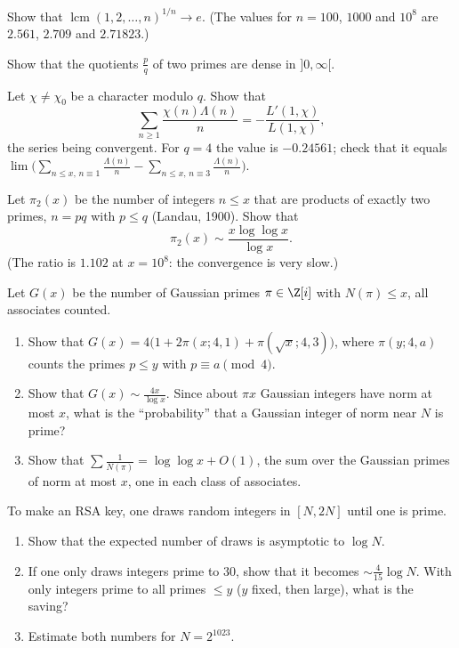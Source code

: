 \begin{exercise}[$\star$]\label{ex:lcm}
Show that $\operatorname{lcm}(1,2,\dots,n)^{1/n}\to e$. (The values for $n=100$, $1000$ and $10^8$ are $2.561$, $2.709$ and $2.71823$.)
\end{exercise}

\begin{exercise}[$\star$]\label{ex:ratios}
Show that the quotients $\frac pq$ of two primes are dense in $]0,\infty[$.
\end{exercise}

\begin{exercise}[$\star\star$]\label{ex:lprimeseries}
Let $\chi\ne\chi_0$ be a character modulo $q$. Show that
\[
\sum_{n\ge1}\frac{\chi(n)\Lambda(n)}n=-\frac{L'(1,\chi)}{L(1,\chi)},
\]
the series being convergent. For $q=4$ the value is $-0.24561$; check that it equals $\lim\bigl(\sum_{n\le x,\,n\equiv1}\frac{\Lambda(n)}n-\sum_{n\le x,\,n\equiv3}\frac{\Lambda(n)}n\bigr)$.
\end{exercise}

\begin{exercise}[$\star\star\star$]\label{ex:semiprimes}
Let $\pi_2(x)$ be the number of integers $n\le x$ that are products of exactly two primes, $n=pq$ with $p\le q$ (Landau, 1900). Show that
\[
\pi_2(x)\sim\frac{x\log\log x}{\log x}.
\]
(The ratio is $1.102$ at $x=10^8$: the convergence is very slow.)
\end{exercise}

\begin{exercise}[$\star\star$]\label{pb:gaussprimes}
Let $G(x)$ be the number of Gaussian primes $\pi\in\Z[i]$ with $N(\pi)\le x$, all associates counted.
\begin{enumerate}[label=(\alph*)]
\item Show that $G(x)=4\bigl(1+2\pi(x;4,1)+\pi(\sqrt x;4,3)\bigr)$, where $\pi(y;4,a)$ counts the primes $p\le y$ with
$p\equiv a\pmod4$.
\item Show that $G(x)\sim\frac{4x}{\log x}$. Since about $\pi x$ Gaussian integers have norm at most $x$, what is the
``probability'' that a Gaussian integer of norm near $N$ is prime?
\item Show that $\sum\frac1{N(\pi)}=\log\log x+O(1)$, the sum over the Gaussian primes of norm at most $x$, one in each
class of associates.
\end{enumerate}
\end{exercise}

\begin{exercise}[$\star$]\label{pb:findprime}
To make an RSA key, one draws random integers in $[N,2N]$ until one is prime.
\begin{enumerate}[label=(\alph*)]
\item Show that the expected number of draws is asymptotic to $\log N$.
\item If one only draws integers prime to $30$, show that it becomes $\sim\frac4{15}\log N$. With only integers prime to all
primes $\le y$ ($y$ fixed, then large), what is the saving?
\item Estimate both numbers for $N=2^{1023}$.
\end{enumerate}
\end{exercise}

